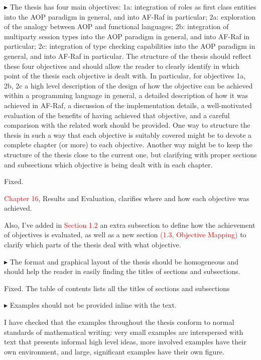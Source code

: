\documentclass{article}
\newcommand*\R[1]{\textcolor{red}{#1}} %
\newenvironment{them}%
  {\bigskip\noindent\begingroup\color{blue}$\blacktriangleright$\enspace}%
  {\endgroup\par}
\begin{document}
\begin{them}
The thesis has four main objectives: 1a: integration of roles as first class
entities into the AOP paradigm in general, and into AF-Raf in particular; 2a:
exploration of the analogy between AOP and functional languages; 2b:
integration of multiparty session types into the AOP paradigm in general, and
into AF-Raf in particular; 2c: integration of type checking capabilities into
the AOP paradigm in general, and into AF-Raf in particular.  The structure of
the thesis should reflect these four objectives and should allow the reader to
clearly identify in which point of the thesis each objective is dealt with. In
particular, for objectives 1a, 2b, 2c a high level description of the design of
how the objective can be achieved within a programming language in general, a
detailed description of how it was achieved in AF-Raf, a discussion of the
implementation details, a well-motivated evaluation of the benefits of having
achieved that objective, and a careful comparison with the related work should
be provided.  One way to structure the thesis in such a way that each objective
is suitably covered might be to devote a complete chapter (or more) to each
objective. Another way might be to keep the structure of the thesis close to
the current one, but clarifying with proper sections and subsections which
objective is being dealt with in each chapter.
\end{them}
Fixed. 

\R{Chapter 16}, Results and Evaluation, clarifies where and how each objective
was achieved.

Also, I've added in \R{Section 1.2} an extra subsection to define how the
achievement of objectives is evaluated, as well as a new  section \R{(1.3,
Objective Mapping)} to clarify which parts of the thesis deal with what
objective.

\begin{them}
The format and graphical layout of the thesis should be homogeneous and should
help the reader in easily finding the titles of sections and subsections.
\end{them}
Fixed. The table of contents lists all the titles of sections and subsections

\begin{them}
Examples should not be provided inline with the text.
\end{them}

I have checked that the examples throughout the thesis conform to normal
standards of mathematical writing: very small examples are interspersed with
text that presents informal high level ideas, more involved examples have their
own environment, and large, significant examples have their own figure.
\end{document}
